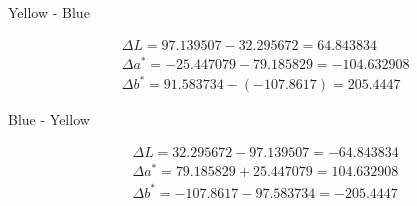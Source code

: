 \documentclass[12pt]{article}
\begin{document}
Yellow - Blue

\begin{equation}
\begin{split}
&\Delta L = 97.139507 - 32.295672 = 64.843834 \\
&\Delta a^* = -25.447079 - 79.185829 = -104.632908 \\
&\Delta b^* = 91.583734 -(-107.8617) = 205.4447
\end{split}
\end{equation}


Blue - Yellow

\begin{equation}
\begin{split}
&\Delta L = 32.295672 - 97.139507 = -64.843834 \\
&\Delta a^* = 79.185829 + 25.447079 = 104.632908\\
&\Delta b^* = -107.8617 - 97.583734 = -205.4447
\end{split}
\end{equation}

\end{document}
